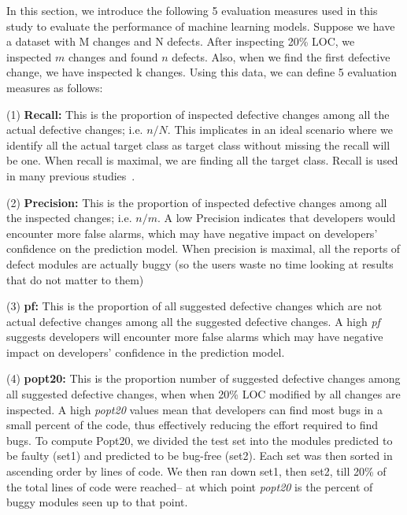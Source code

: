 \documentclass[10pt,journal,compsoc]{IEEEtran}
\newcommand{\respto}[1]{
\fcolorbox{black}{black!15}{%
\label{resp:#1}%
\bf\scriptsize R{#1}}}
\begin{document}
In this section, we introduce the following 5 evaluation measures used in this study to evaluate the performance of machine learning models. Suppose we have a dataset with M changes and N defects. After inspecting 20\% LOC, we inspected $m$ changes and found $n$ defects. Also, when we find the first defective change, we have inspected k changes. Using
this data, we can define 5 evaluation measures  as follows:
{\color{blue}\respto{1-5f} 
(1) \textbf{Recall:} This is the proportion of inspected defective changes among all the actual defective changes; i.e. $n/N$. This implicates in an ideal scenario where we identify all the actual target class as target class without missing the recall will be one. When recall is maximal, we are finding all  the target class. Recall is used in  many previous studies~\cite{kamei2012large,yang2016effort,yang2017tlel,xia2016collective,yang2015deep}.  

(2) \textbf{Precision:} This is the proportion of inspected defective changes among all the inspected changes; i.e. $n/m$. A low Precision indicates that developers would encounter more false alarms, which may have negative impact on developers' confidence on the prediction model. When precision is maximal, all the reports of defect modules are actually buggy (so the users waste no time looking at results that do not matter to them)

(3) \textbf{pf:} This is the proportion of all suggested defective changes which are not actual defective changes among all the suggested defective changes. A high {\em pf} suggests developers will encounter more false alarms which may have negative impact on developers' confidence in the prediction model.

(4) \textbf{popt20:} This is the proportion number of suggested defective changes among all suggested defective changes, when when 20\% LOC modified by all changes are inspected. A high {\em popt20} values mean that developers can find most bugs in a small percent of the code, thus effectively reducing the effort required to find bugs. To compute Popt20, we divided the test set into the modules predicted to be faulty (set1) and predicted to be bug-free (set2). Each set was then sorted in ascending order by lines of code.  We then ran down set1, then set2, till 20\% of the total lines of code were reached-- at which point {\em popt20} is the percent of buggy modules seen up to that point.

}
\end{document}
